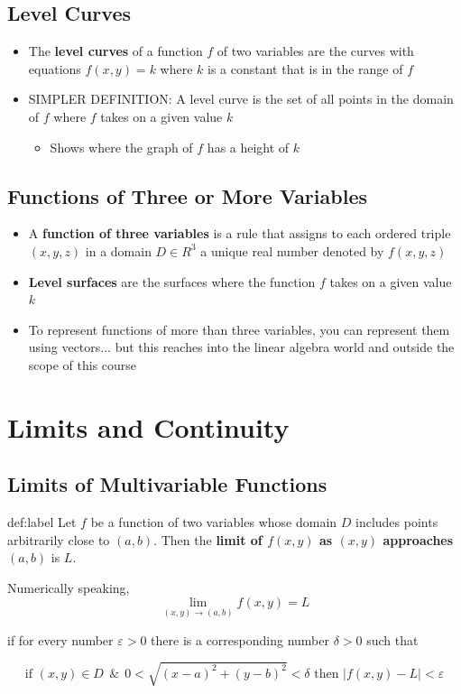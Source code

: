 \documentclass{package/notes}
\begin{document}
\subsection{Level Curves}

\begin{itemize}
	\item The \textbf{level curves} of a function $f$ of two variables are the curves with equations $f(x,y)=k$ where $k$ is a constant that is in the range of $f$
	\item SIMPLER DEFINITION: A level curve is the set of all points in the domain of $f$ where $f$ takes on a given value $k$
	\begin{itemize}
		\item Shows where the graph of $f$ has a height of $k$
	\end{itemize}
\end{itemize}

\subsection{Functions of Three or More Variables}

\begin{itemize}
	\item A \textbf{function of three variables} is a rule that assigns to each ordered triple $(x,y,z)$ in a domain $D \in R^3$ a unique real number denoted by $f(x,y,z)$
	\item \textbf{Level surfaces} are the surfaces where the function $f$ takes on a given value $k$
	\item To represent functions of more than three variables, you can represent them using vectors... but this reaches into the linear algebra world and outside the scope of this course
\end{itemize}



\section{Limits and Continuity}

\subsection{Limits of Multivariable Functions}

\begin{definition}{def:label}
	Let $f$ be a function of two variables whose domain $D$ includes points arbitrarily close to $(a,b)$. Then the \textbf{limit of $f(x,y)$ as $(x,y)$ approaches $(a,b)$} is $L$.\newline

	Numerically speaking, 
	$$\lim_{(x,y)\to(a,b)}f(x,y)=L$$

	if for every number $\varepsilon > 0$ there is a corresponding number $\delta > 0$ such that

	$$\text{if } (x,y)\in D \:\:\&\:\: 0<\sqrt{(x-a)^2+(y-b)^2}<\delta \text{ then } |f(x,y)-L|<\varepsilon$$
\end{definition}
\end{document}
